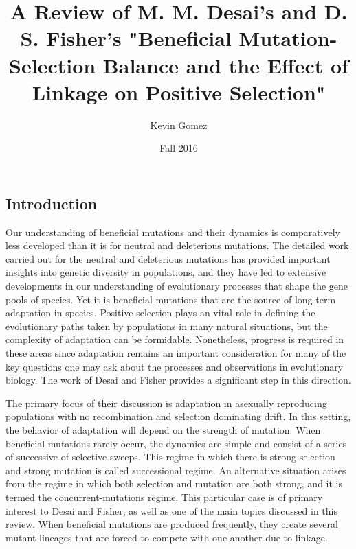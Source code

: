 \documentclass[12pt]{article}
\title{A Review of M. M. Desai's and D. S. Fisher's "Beneficial Mutation-Selection Balance and the Effect of Linkage on Positive Selection"}
\date{Fall 2016}
\author{Kevin Gomez}
\begin{document}
\maketitle
\newpage


\newpage
\subsection*{Introduction}
Our understanding of beneficial mutations and their dynamics is comparatively less developed than it is for neutral and deleterious mutations.  The detailed work carried out for the neutral and deleterious mutations has provided important insights into genetic diversity in populations, and they have led to extensive developments in our understanding of evolutionary processes that shape the gene pools of species.  Yet it is beneficial mutations that are the source of long-term adaptation in species.  Positive selection plays an vital role in defining the evolutionary paths taken by populations in many natural situations, but the complexity of adaptation can be formidable.  Nonetheless, progress is required in these areas since adaptation remains an important consideration for many of the key questions one may ask about the processes and observations in evolutionary biology.  The work of Desai and Fisher provides a significant step in this direction.

The primary focus of their discussion is adaptation in asexually reproducing populations with no recombination and selection dominating drift.  In this setting, the behavior of adaptation will depend on the strength of mutation.  When beneficial mutations rarely occur, the dynamics are simple and consist of a series of successive of selective sweeps.  This regime in which there is strong selection and strong mutation is called successional regime.  An alternative situation arises from the regime in which both selection and mutation are both strong, and it is termed the concurrent-mutations regime.  This particular case is of primary interest to Desai and Fisher, as well as one of the main topics discussed in this review.  When beneficial mutations are produced frequently, they create several mutant lineages that are forced to compete with one another due to linkage.  
\end{document}
